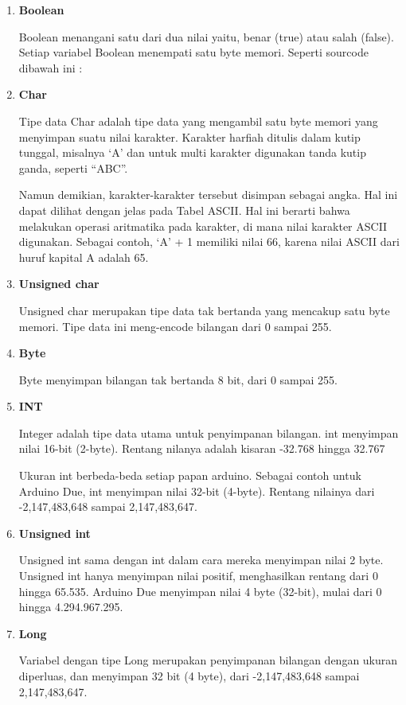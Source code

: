 \begin{enumerate}
\begin{enumerate}
    \item \textbf{Boolean}
    \par Boolean menangani satu dari dua nilai yaitu, benar (true) atau salah (false). Setiap variabel Boolean menempati satu byte memori. Seperti sourcode dibawah ini :
     
     \item\textbf{Char}
     \par Tipe data Char adalah tipe data yang mengambil satu byte memori yang menyimpan suatu nilai karakter. Karakter harfiah ditulis dalam kutip tunggal, misalnya ‘A’ dan untuk multi karakter digunakan tanda kutip ganda, seperti “ABC”.

    \par Namun demikian, karakter-karakter tersebut disimpan sebagai angka. Hal ini dapat dilihat dengan jelas pada Tabel ASCII. Hal ini berarti bahwa  melakukan operasi aritmatika pada karakter, di mana nilai karakter ASCII digunakan. Sebagai contoh, ‘A’ + 1 memiliki nilai 66, karena nilai ASCII dari huruf kapital A adalah 65.
    
    \item \textbf{Unsigned char}
    \par Unsigned char merupakan tipe data tak bertanda yang mencakup satu byte memori. Tipe data ini meng-encode bilangan dari 0 sampai 255.
    
    
    \item \textbf{Byte}
    \par Byte menyimpan bilangan tak bertanda 8 bit, dari 0 sampai 255.
    
    \item \textbf{INT}
    \par Integer adalah tipe data utama untuk penyimpanan bilangan. int menyimpan nilai 16-bit (2-byte). Rentang nilanya adalah kisaran -32.768 hingga 32.767 
    \par Ukuran int berbeda-beda setiap papan arduino. Sebagai contoh untuk Arduino Due, int menyimpan nilai 32-bit (4-byte). Rentang nilainya dari -2,147,483,648 sampai 2,147,483,647.
    
    \item\textbf{Unsigned int}
    \par Unsigned int sama dengan int dalam cara mereka menyimpan nilai 2 byte. Unsigned int hanya menyimpan nilai positif, menghasilkan rentang dari 0 hingga 65.535. Arduino Due menyimpan nilai 4 byte (32-bit), mulai dari 0 hingga 4.294.967.295.
    
    \item \textbf{Long}
    \par Variabel dengan tipe Long merupakan penyimpanan bilangan dengan ukuran diperluas, dan menyimpan 32 bit (4 byte), dari -2,147,483,648 sampai 2,147,483,647.
    
    

\end{enumerate}
\end{enumerate}
